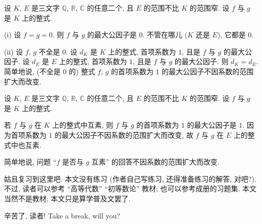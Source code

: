 \begin{proposition}
    设 $K$, $E$ 是三文字 $\mathbb{Q}$, $\mathbb{R}$, $\mathbb{C}$ 的任意二个, 且 $E$ 的范围不比 $K$ 的范围窄. 设 $f$ 与 $g$ 是 $K$ 上的整式.

    (i) 设 $f = g = 0$. 则 $f$ 与 $g$ 的最大公因子是 $0$. 不管在哪{\scriptsize 儿} ($K$ 还是 $E$), 它都是 $0$.

    (ii) 设 $f$, $g$ 不全是 $0$. 设 $d_K$ 是 $K$ 上的整式, 首项系数为 $1$, 且是 $f$ 与 $g$ 的最大公因子. 设 $d_E$ 是 $E$ 上的整式, 首项系数为 $1$, 且是 $f$ 与 $g$ 的最大公因子. 则 $d_K = d_E$. 简单地说, (不全是 $0$ 的) 整式 $f$, $g$ 的首项系数为 $1$ 的最大公因子不因系数的范围扩大而改变.
\end{proposition}

\begin{proposition}
    设 $K$, $E$ 是三文字 $\mathbb{Q}$, $\mathbb{R}$, $\mathbb{C}$ 的任意二个, 且 $E$ 的范围不比 $K$ 的范围窄. 设 $f$ 与 $g$ 是 $K$ 上的整式.

    若 $f$ 与 $g$ 在 $K$ 上的整式中互素, 则 $f$ 与 $g$ 的首项系数为 $1$ 的最大公因子是 $1$. 因为首项系数为 $1$ 的最大公因子不因系数的范围扩大而改变, 故 $f$ 与 $g$ 在 $E$ 上的整式中也互素.

    简单地说, 问题 ``$f$ 是否与 $g$ 互素'' 的回答不因系数的范围扩大而改变.
\end{proposition}

姑且复习到这里吧. 本文没有练习 (作者自己写练习, 还得准备练习的解答, 对吧?). 不过, 读者可以参考 ``高等代数'' ``初等数论'' 教材; 也可以参考成册的习题集. 本文当然不是教材; 本文只是算学普及文罢了.

辛苦了, 读者! Take a break, will you?
